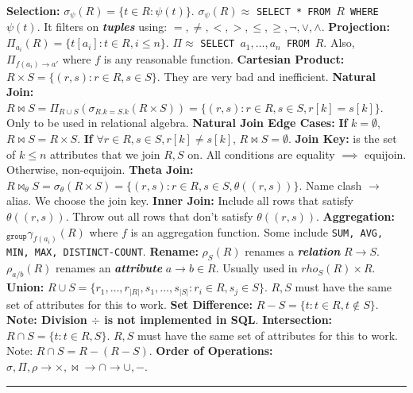 \documentclass{report}
\renewcommand{\bf}[1]{\textbf{{#1}}}
\renewcommand{\tt}[1]{\texttt{{#1}}}
\newcommand{\ib}[1]{\textit{\textbf{{#1}}}}
\begin{document}
\bf{Selection:} $\sigma_{\psi} (R) = \{t \in R : \psi(t)\}$. $\sigma_{\psi} (R) \approx$
\tt{SELECT * FROM $R$ WHERE $\psi (t)$}. It filters on \ib{tuples} using: $=, \neq, <, >, \leq,
\geq, \lnot, \lor, \land$.
\hfil \newline
\bf{Projection:} $\Pi_{a_i} (R) = \{t[a_i] : t \in R, i \leq n\}$. $\Pi \approx$ \tt{SELECT
$a_1, \ldots, a_n$ FROM $R$}. Also, $\Pi_{f(a_i) \to a'}$ where $f$ is any reasonable
function.
\hfil \newline
\bf{Cartesian Product:} $R \times S = \{ (r, s) :r \in R, s \in S\}$. They are very bad and
inefficient.
\hfil \newline
\bf{Natural Join:} $R \bowtie S = \Pi_{R \cup S} (\sigma_{R.k = S.k} (R \times S)) = \{(r, s) :
r \in R, s \in S, r[k] = s[k]\}$. Only to be used in relational algebra.
\hfil \newline
\bf{Natural Join Edge Cases:} \bf{If} $k = \emptyset$, $R \bowtie S = R \times S$. \bf{If}
$\forall r \in R, s \in S, r[k] \neq s[k]$, $R \bowtie S = \emptyset$.
\hfil \newline
\bf{Join Key:} is the set of $k \leq n$ attributes that we join $R, S$ on. All conditions are
equality $\implies$ equijoin. Otherwise, non-equijoin.
\hfil \newline
\bf{Theta Join:} $R \bowtie_{\theta} S = \sigma_{\theta} (R \times S) = \{(r, s) : r \in R,
s \in S, \theta((r, s))\}$. Name clash $\to$ alias. We choose the join key.
\hfil \newline
\bf{Inner Join:} Include all rows that satisfy $\theta((r, s))$. Throw out all rows that don't
satisfy $\theta((r, s))$.
\hfil \newline
\bf{Aggregation:} $_{\tt{group}}\gamma_{f(a_i)} (R)$ where $f$ is an aggregation function. Some
include \tt{SUM, AVG, MIN, MAX, DISTINCT-COUNT}.
\hfil \newline
\bf{Rename:} $\rho_{S} (R)$ renames a \ib{relation} $R \to S$. $\rho_{a/b} (R)$ renames an
\ib{attribute} $a \to b \in R$. Usually used in $rho_{S} (R) \times R$.
\hfil \newline
\bf{Union:} $R \cup S = \{r_1, \ldots, r_{|R|}, s_1, \ldots, s_{|S|} : r_i \in R, s_j \in S\}$.
$R, S$ must have the same set of attributes for this to work.
\hfil \newline
\bf{Set Difference:} $R - S = \{t : t \in R, t \not \in S\}$. \bf{Note: Division $\div$ is not
implemented in SQL}.
\hfil \newline
\bf{Intersection:} $R \cap S = \{t : t \in R, S\}$. $R, S$ must have the same set of attributes
for this to work. Note: $R \cap S = R - (R - S)$.
\hfil \newline
\bf{Order of Operations:} $\sigma, \Pi, \rho \to \times, \bowtie \to \cap \to \cup, -$.
\hfil \newline
\vspace{-0.8em}
\hrule
\vspace{0.2em}
\end{document}

